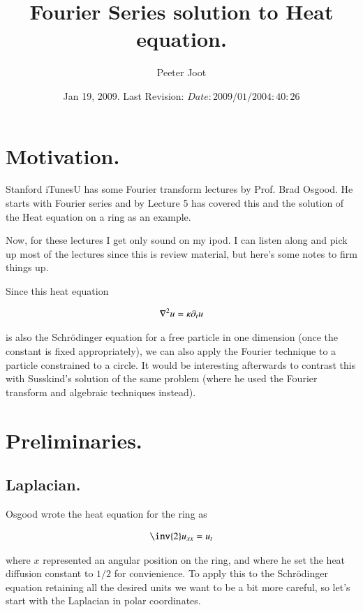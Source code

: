 \documentclass{article}
\title{ Fourier Series solution to Heat equation. }
\author{Peeter Joot}
\date{ Jan 19, 2009.  Last Revision: $Date: 2009/01/20 04:40:26 $ }
\begin{document}
\maketitle{}


\section{ Motivation. }

Stanford iTunesU has some Fourier transform lectures by Prof. Brad Osgood.
He starts with Fourier series and by Lecture 5 has covered this and
the solution of the Heat equation on a ring as an example.

Now, for these lectures I get only sound on my ipod.  I can listen along and
pick up most of the lectures since this is review material, but here's some
notes to firm things up.

Since this heat equation

\begin{align}
\nabla^2 u = \kappa \partial_t u
\end{align}

is also the Schr\"{o}dinger equation for a free particle in one 
dimension (once the 
constant is fixed appropriately), we can also apply the Fourier
technique to a particle
constrained to a circle.  It would be interesting afterwards to 
contrast this with Susskind's solution of the
same problem (where he used the Fourier transform and algebraic techniques
instead).

\section{ Preliminaries. }

\subsection{ Laplacian. }

Osgood wrote the heat equation for the ring as

\begin{align*}
\inv{2} u_{xx} = u_t
\end{align*}

where $x$ represented an angular position on the ring, and where
he set the heat diffusion constant to $1/2$ for convienience.
To apply this to the Schr\"{o}dinger equation retaining all the desired
units we want to be a bit more careful, so let's start with the Laplacian
in polar coordinates.
\end{document}

